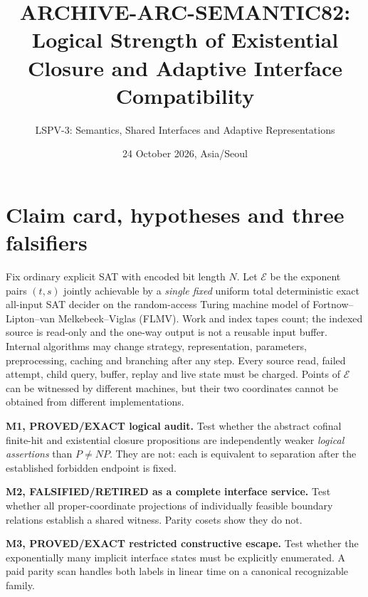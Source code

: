 \documentclass[11pt]{article}
\title{ARCHIVE-ARC-SEMANTIC82:\\Logical Strength of Existential Closure and Adaptive Interface Compatibility}
\author{LSPV-3: Semantics, Shared Interfaces and Adaptive Representations}
\date{24 October 2026, Asia/Seoul}
\newcommand{\EE}{\mathcal E}
\begin{document}
\maketitle
\begin{center}\end{center}

\section{Claim card, hypotheses and three falsifiers}
Fix ordinary explicit SAT with encoded bit length $N$. Let $\EE$ be the exponent pairs $(t,s)$ jointly achievable by a \emph{single fixed} uniform total deterministic exact all-input SAT decider on the random-access Turing machine model of Fortnow--Lipton--van Melkebeek--Viglas (FLMV). Work and index tapes count; the indexed source is read-only and the one-way output is not a reusable input buffer. Internal algorithms may change strategy, representation, parameters, preprocessing, caching and branching after any step. Every source read, failed attempt, child query, buffer, replay and live state must be charged. Points of $\EE$ can be witnessed by different machines, but their two coordinates cannot be obtained from different implementations.

\par\noindent\textbf{M1, PROVED/EXACT logical audit.} Test whether the abstract cofinal finite-hit and existential closure propositions are independently weaker \emph{logical assertions} than $P\ne NP$. They are not: each is equivalent to separation after the established forbidden endpoint is fixed.
\par\noindent\textbf{M2, FALSIFIED/RETIRED as a complete interface service.} Test whether all proper-coordinate projections of individually feasible boundary relations establish a shared witness. Parity cosets show they do not.
\par\noindent\textbf{M3, PROVED/EXACT restricted constructive escape.} Test whether the exponentially many implicit interface states must be explicitly enumerated. A paid parity scan handles both labels in linear time on a canonical recognizable family.
\end{document}
